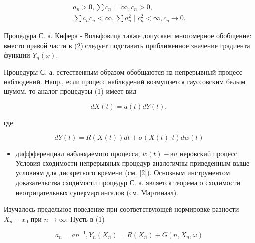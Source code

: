 \documentclass[10pt]{article}
\begin{document}
\[

\begin{gathered}

a_{n}>0, \sum c_{n}=\infty, c_{n}>0, \\

\sum a_{n} c_{n}<\infty, \sum a_{n}^{2} \mid c_{n}^{2}<\infty, c_{n} \longrightarrow 0 .

\end{gathered}

\]



Процедура С. а. Кифера - Вольфовица также допускает многомерное обобщение: вместо правой части в (2) следует подставить приближенное значение градиента функции $Y_{n}(x)$.



Процедуры С. а. естественным образом обобщаются на непрерывный процесс наблюдений. Напр., если процесс наблюдений возмущается гауссовским белым шумом, то аналог процедуры (1) имеет вид



\[

d X(t)=a(t) d Y(t),

\]



где



\[

d Y(t)=R(X(t)) d t+\sigma(X(t), t) d w(t)

\]



\begin{itemize}

  \item диффференциал наблюдаемого процесса, $w(t)-в u$ неровский процесс. Условия сходимости непрерывных процедур аналогичны приведенным выше условиям для дискретного времени (см. [2]). Основным инструментом доказательства сходимости процедур С. а. является теорема о сходимости неотрицательных супермартингалов (см. Мартинаал).

\end{itemize}



Изучалось предельное поведение при соответствующей нормировке разности $X_{n}-x_{0}$ при $n \rightarrow \infty$. Пусть в (1)



\[

a_{n}=a n^{-1}, Y_{n}\left(X_{n}\right)=R\left(X_{n}\right)+G\left(n, X_{n}, \omega\right)

\]
\end{document}
